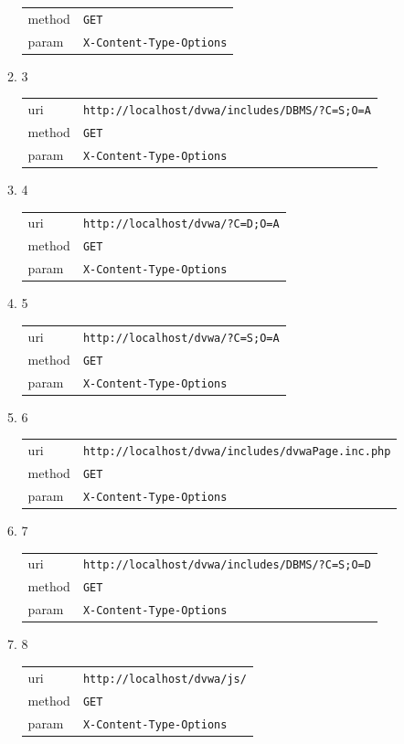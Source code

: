 \documentclass[10pt]{article}
\begin{document}
\begin{itemize}
\begin{enumerate}
\begin{tabular}{| l | p{12cm}}
method & \texttt{GET} \\
param & \texttt{X-Content-Type-Options} \\
\end{tabular}
\item[] 3
\begin{tabular}{| l | p{12cm}}
uri & \texttt{http://localhost/dvwa/includes/DBMS/?C=S;O=A} \\
method & \texttt{GET} \\
param & \texttt{X-Content-Type-Options} \\
\end{tabular}
\item[] 4
\begin{tabular}{| l | p{12cm}}
uri & \texttt{http://localhost/dvwa/?C=D;O=A} \\
method & \texttt{GET} \\
param & \texttt{X-Content-Type-Options} \\
\end{tabular}
\item[] 5
\begin{tabular}{| l | p{12cm}}
uri & \texttt{http://localhost/dvwa/?C=S;O=A} \\
method & \texttt{GET} \\
param & \texttt{X-Content-Type-Options} \\
\end{tabular}
\item[] 6
\begin{tabular}{| l | p{12cm}}
uri & \texttt{http://localhost/dvwa/includes/dvwaPage.inc.php} \\
method & \texttt{GET} \\
param & \texttt{X-Content-Type-Options} \\
\end{tabular}
\item[] 7
\begin{tabular}{| l | p{12cm}}
uri & \texttt{http://localhost/dvwa/includes/DBMS/?C=S;O=D} \\
method & \texttt{GET} \\
param & \texttt{X-Content-Type-Options} \\
\end{tabular}
\item[] 8
\begin{tabular}{| l | p{12cm}}
uri & \texttt{http://localhost/dvwa/js/} \\
method & \texttt{GET} \\
param & \texttt{X-Content-Type-Options} \\

\end{tabular}
\end{enumerate}
\end{itemize}
\end{document}
